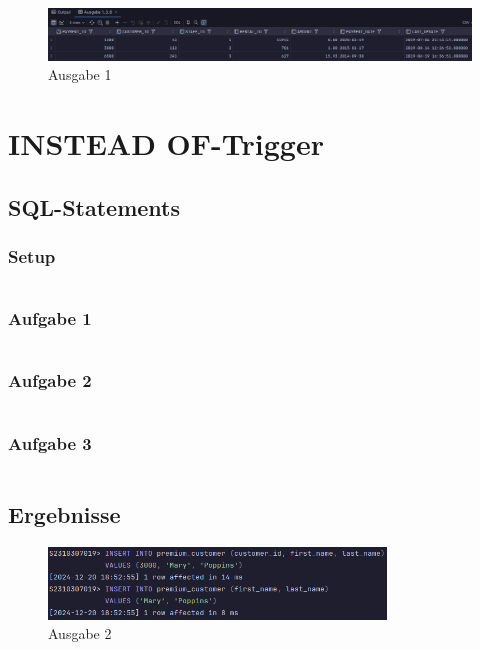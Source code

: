 \documentclass[12pt]{scrartcl}
\begin{document}
\begin{figure}[H]
	\centering
	\includegraphics[width=1\textwidth]{../1_3_6.png}
	\caption{Ausgabe 1}
\end{figure}

\pagebreak

\section{INSTEAD OF-Trigger}

\subsection{SQL-Statements}

\subsubsection{Setup}
\inputminted{sql}{../ue5_2.sql}

\subsubsection{Aufgabe 1}
\inputminted{sql}{../ue5_2_1.sql}

\subsubsection{Aufgabe 2}
\inputminted{sql}{../ue5_2_2.sql}

\subsubsection{Aufgabe 3}
\inputminted{sql}{../ue5_2_3.sql}

\subsection{Ergebnisse}

\begin{figure}[H]
	\centering
	\includegraphics[width=0.8\textwidth]{../2_3_1.png}
	\caption{Ausgabe 2}
\end{figure}
\end{document}
